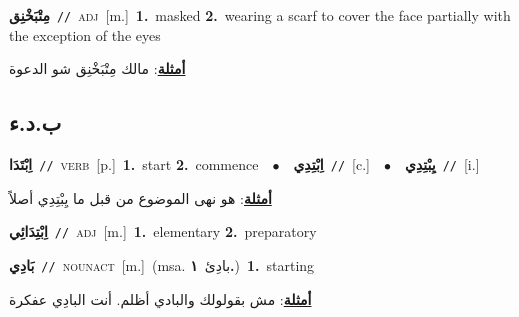 \documentclass[10pt,a4paper,twoside]{article} %
\begin{document}
\begin{multicols}{2}
{\setlength\topsep{0pt}\textbf{\foreignlanguage{arabic}{مِتْبَخْنِق}}\ {\color{gray}\texttt{//}\color{black}}\ \textsc{adj}\ [m.]\ \textbf{1.}~masked  \textbf{2.}~wearing a scarf to cover the face partially with the exception of the eyes\  \begin{flushright}\color{gray}\foreignlanguage{arabic}{\textbf{\underline{\foreignlanguage{arabic}{أمثلة}}}: مالك مِتْبَخْنِق شو الدعوة}\end{flushright}\color{black}} \vspace{2mm}

\vspace{-3mm}
\subsection*{\color{blue}\foreignlanguage{arabic}{ب.د.ء}\color{blue}{}} 

{\setlength\topsep{0pt}\textbf{\foreignlanguage{arabic}{اِبْتَدَا}}\ {\color{gray}\texttt{//}\color{black}}\ \textsc{verb}\ [p.]\ \textbf{1.}~start  \textbf{2.}~commence\ \ $\bullet$\ \ \setlength\topsep{0pt}\textbf{\foreignlanguage{arabic}{اِبْتِدِي}}\ {\color{gray}\texttt{//}\color{black}}\ [c.]\ \ $\bullet$\ \ \setlength\topsep{0pt}\textbf{\foreignlanguage{arabic}{يِبْتِدِي}}\ {\color{gray}\texttt{//}\color{black}}\ [i.]\  \begin{flushright}\color{gray}\foreignlanguage{arabic}{\textbf{\underline{\foreignlanguage{arabic}{أمثلة}}}: هو نهى الموضوع من قبل ما يِبْتِدِي أصلاً}\end{flushright}\color{black}} \vspace{2mm}

{\setlength\topsep{0pt}\textbf{\foreignlanguage{arabic}{اِبْتِدَائِي}}\ {\color{gray}\texttt{//}\color{black}}\ \textsc{adj}\ [m.]\ \textbf{1.}~elementary  \textbf{2.}~preparatory\ } \vspace{2mm}

{\setlength\topsep{0pt}\textbf{\foreignlanguage{arabic}{بَادِي}}\ {\color{gray}\texttt{//}\color{black}}\ \textsc{noun\textunderscore act}\ [m.]\ \color{gray}(msa. \foreignlanguage{arabic}{بادِئ}~\foreignlanguage{arabic}{\textbf{١.}})\color{black}\ \textbf{1.}~starting\  \begin{flushright}\color{gray}\foreignlanguage{arabic}{\textbf{\underline{\foreignlanguage{arabic}{أمثلة}}}: مش بقولولك والبادي أظلم. أنت البادِي عفكرة}\end{flushright}\color{black}} \vspace{2mm}


\end{multicols}
\end{document}
